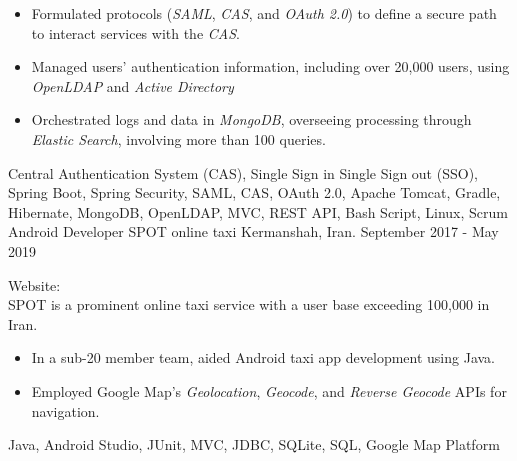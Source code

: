 \begin{experiences}
{\begin{itemize}
\item Formulated protocols (\emph{SAML}, \emph{CAS}, and \emph{OAuth 2.0}) to define a secure path to interact services with the \textit{CAS}.
\item Managed users' authentication information, including over 20,000 users, using \emph{OpenLDAP} and \emph{Active Directory}
\item Orchestrated logs and data in \emph{MongoDB}, overseeing processing through \emph{Elastic Search}, involving more than 100 queries.
\end{itemize}
}{Central Authentication System (CAS), Single Sign in Single Sign out (SSO), Spring Boot, Spring Security, SAML, CAS, OAuth 2.0, Apache Tomcat, Gradle, Hibernate, MongoDB, OpenLDAP, MVC, REST API, Bash Script, Linux, Scrum}
\emptySeparator
\experience
  {}
  {Android Developer}
  {SPOT online taxi}
  {Kermanshah, Iran. \hspace{140 pt} September 2017 - May 2019}
  {}
  {
  Website: \\
  SPOT is a prominent online taxi service with a user base exceeding 100,000 in Iran. 
  \begin{itemize}
    \item In a sub-20 member team, aided Android taxi app development using Java.
    \item Employed Google Map's \emph{Geolocation}, \emph{Geocode}, and \emph{Reverse Geocode} APIs for navigation.\end{itemize}
  }{Java, Android Studio, JUnit, MVC, JDBC, SQLite, SQL, Google Map Platform}

\emptySeparator


\end{experiences}
